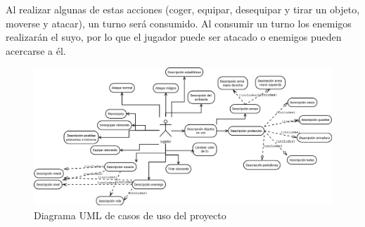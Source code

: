 Al realizar algunas de estas acciones (coger, equipar, desequipar y tirar un objeto, moverse y atacar), un turno será consumido. Al consumir un turno los enemigos realizarán el suyo, por lo que el jugador puede ser atacado o enemigos pueden acercarse a él.

\begin{figure}[h!]
    \centering
    \includegraphics[width=0.9\textheight,angle=90]{img/casosdeuso.png}
    \caption{Diagrama UML de casos de uso del proyecto}
    \label{fig:casosdeuso}
\end{figure}